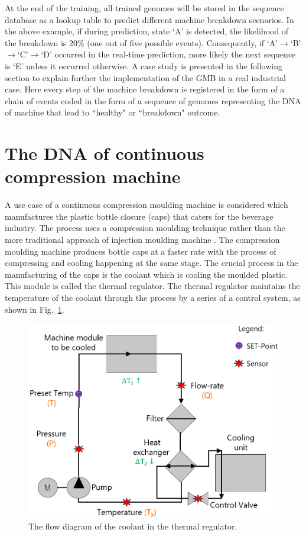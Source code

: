\documentclass[conference]{IEEEtran}
\begin{document}
At the end of the training, all trained genomes will be stored in the sequence database as a lookup table to predict different machine breakdown scenarios. In the above example, if during prediction, state `A' is detected, the likelihood of the breakdown is $20\%$ (one out of five possible events). Consequently, if `A'$\to$`B'$\to$`C'$\to$`D' occurred in the real-time prediction, more likely the next sequence is `E' unless it occurred otherwise.
A case study is presented in the following section to explain further the implementation of the GMB in a real industrial case. Here every step of the machine breakdown is registered in the form of a chain of events coded in the form of a sequence of genomes representing the DNA of machine that lead to ``healthy" or ``breakdown" outcome.

\section{The DNA of continuous compression machine}
\label{sec:DNA_CCM}
A use case of a continuous compression moulding machine is considered which manufactures the plastic bottle closure (caps) that caters for the beverage industry. The process uses a compression moulding technique rather than the more traditional approach of injection moulding machine \cite{Liu2020}. The compression moulding \cite{Peltonen1992} machine produces bottle caps at a faster rate with the process of compressing and cooling happening at the same stage. The crucial process in the manufacturing of the caps is the coolant which is cooling the moulded plastic. This module is called the thermal regulator. The thermal regulator maintains the temperature of the coolant through the process by a series of a control system, as shown in Fig.~\ref{fig:TH_schematic}.
\begin{figure}[b]
\centerline{\includegraphics[width=0.59\linewidth]{TH_schematic.png}}
\caption{The flow diagram of the coolant in the thermal regulator.}
\label{fig:TH_schematic}
\end{figure}
\end{document}
